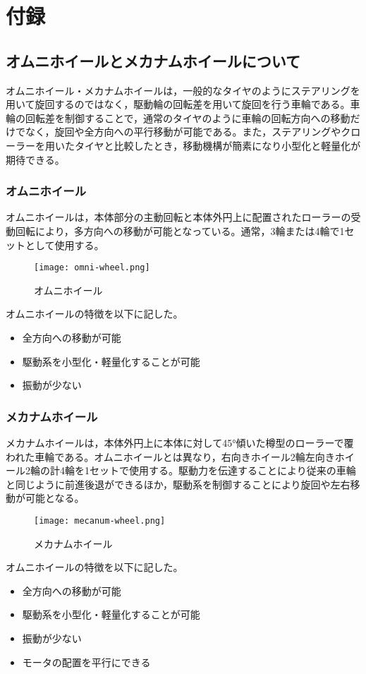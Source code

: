 \documentclass[dvipdfmx]{jsarticle}
\begin{document}
\section{付録}

\subsection{オムニホイールとメカナムホイールについて}
オムニホイール・メカナムホイールは，一般的なタイヤのようにステアリングを用いて旋回するのではなく，駆動輪の回転差を用いて旋回を行う車輪である。車輪の回転差を制御することで，通常のタイヤのように車輪の回転方向への移動だけでなく，旋回や全方向への平行移動が可能である。また，ステアリングやクローラーを用いたタイヤと比較したとき，移動機構が簡素になり小型化と軽量化が期待できる。
\subsubsection{オムニホイール}
オムニホイールは，本体部分の主動回転と本体外円上に配置されたローラーの受動回転により，多方向への移動が可能となっている。通常，3輪または4輪で1セットとして使用する。
\begin{figure}[H]
    \centering
    \texttt{[image: omni-wheel.png]}
    \caption{オムニホイール}
    \label{fig:omni-wheel}
\end{figure}
オムニホイールの特徴を以下に記した。
\begin{itemize}
    \item 全方向への移動が可能
    \item 駆動系を小型化・軽量化することが可能
    \item 振動が少ない
\end{itemize}

\subsubsection{メカナムホイール}
メカナムホイールは，本体外円上に本体に対して45°傾いた樽型のローラーで覆われた車輪である。オムニホイールとは異なり，右向きホイール2輪左向きホイール2輪の計4輪を1セットで使用する。駆動力を伝達することにより従来の車輪と同じように前進後退ができるほか，駆動系を制御することにより旋回や左右移動が可能となる。
\begin{figure}[H]
    \centering
    \texttt{[image: mecanum-wheel.png]}
    \caption{メカナムホイール}
    \label{fig:omni-wheel}
\end{figure}
オムニホイールの特徴を以下に記した。
\begin{itemize}
    \item 全方向への移動が可能
    \item 駆動系を小型化・軽量化することが可能
    \item 振動が少ない
    \item モータの配置を平行にできる
\end{itemize}
\end{document}
